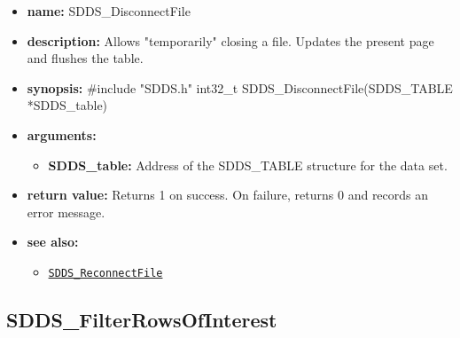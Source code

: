 \documentclass[11pt]{article}
\newcommand{\progref}[1]{\hyperref[SDDS_#1]{\tt SDDS\_#1}}
\begin{document}
\begin{itemize}
\item {\bf name:}\newline
SDDS\_DisconnectFile
\item {\bf description:}\newline
Allows "temporarily" closing a file. Updates the present page and flushes the table.
\item {\bf synopsis:} \#include "SDDS.h"\newline
int32\_t SDDS\_DisconnectFile(SDDS\_TABLE *SDDS\_table)
\item {\bf arguments:}
\begin{itemize}
\item {\bf SDDS\_table:} Address of the SDDS\_TABLE structure for the data set.
\end{itemize}
\item {\bf return value:}\newline
Returns 1 on success. On failure, returns 0 and records an error message.
\item {\bf see also:}
\begin{itemize}
\item \progref{ReconnectFile}
\end{itemize}
\end{itemize}

\subsection{SDDS\_FilterRowsOfInterest}
\label{SDDS_FilterRowsOfInterest}
\end{document}
